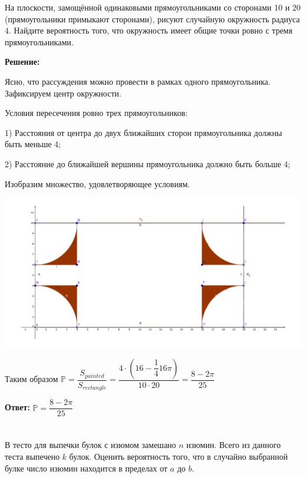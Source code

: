 \documentclass[a4paper,12pt]{article}
\newcommand{\lt}{\left}
\newcommand{\rt}{\right}
\newcommand{\dfr}{\dfrac}
\newcommand{\bb}{\mathbb}
\begin{document}
На плоскости, замощённой одинаковыми прямоугольниками со сторонами 10 и
20 (прямоугольники примыкают сторонами), рисуют случайную окружность радиуса 4. Найдите вероятность того, что окружность имеет общие точки ровно с
тремя прямоугольниками.

\vspace{\baselineskip}

\textbf{Решение:}

\vspace{\baselineskip}

Ясно, что рассуждения можно провести в рамках одного прямоугольника. Зафиксируем центр окружности.

Условия пересечения ровно трех прямоугольников:

1) Расстояния от центра до двух ближайших сторон прямоугольника должны быть меньше 4;

2) Расстояние до ближайшей вершины прямоугольника должно быть больше 4; 

Изобразим множество, удовлетворяющее условиям.

\includegraphics[width=\textwidth]{problem2.pdf}

Таким образом $\bb P = \dfr{S_{painted}}{S_{rectangle}} = \dfr{4\cdot\lt(16-\dfr{1}{4}16\pi\rt)}{10\cdot20} = \dfr{8-2\pi}{25}$

\textbf{Ответ:} $\bb P = \dfr{8-2\pi}{25}$


\section{}

В тесто для выпечки булок с изюмом замешано $n$ изюмин. Всего из данного
теста выпечено $k$ булок. Оценить вероятность того, что в случайно выбранной
булке число изюмин находится в пределах от $a$ до $b$.
\end{document}
